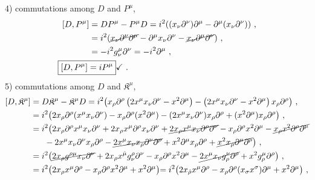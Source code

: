 \documentclass[12pt,a4paper]{report}
\begin{document}
4) commutations among $D$ and $P^{{\mu}}$,
\begin{align*}
    \left[D, P^{{\mu}}\right]&=DP^{\mu}-P^{{\mu}}D=i^2((x_{{\nu}}\partial^{{\nu}})\partial^{{\mu}}-\partial^{{\mu}}(x_{{\nu}}\partial^{{\nu}}))~,\\
    &=i^2(\cancel{x_{{\nu}}\partial^{{\nu}}\partial^{{\mu}}}-\partial^{{\mu}}x_{{\nu}}\partial^{{\nu}}-\cancel{x_{{\nu}}\partial^{{\mu}}\partial^{{\nu}}})~,\\
    &=-i^2g^{{\mu}}_{{\nu}}\partial^{{\nu}}=-i^2\partial^{{\mu}}~,\\
    \Aboxed{\left[D, P^{{\mu}}\right]&=iP^{{\mu}}}\checkmark~.
\end{align*}
5) commutations among $D$ and $\mathfrak{K}^{{\mu}}$,
\begin{align*}
    \left[D, \mathfrak{K}^{{\mu}}\right]&=D\mathfrak{K}^{{\mu}}- \mathfrak{K}^{{\mu}}D=i^2\bigl(x_{{\rho}}\partial^{{\rho}} \left(2x^{{\mu}}x_{{\nu}}\partial^{{\nu}}-x^2\partial^{{\mu}}\right)-\left(2x^{{\mu}}x_{{\nu}}\partial^{{\nu}}-x^2\partial^{{\mu}}\right)x_{{\rho}}\partial^{{\rho}}\bigl)~,\\
    &=i^2\bigl(2x_{{\rho}}\partial^{{\rho}}(x^{{\mu}}x_{{\nu}}\partial^{{\nu}})-x_{{\rho}}\partial^{{\rho}}(x^2\partial^{{\mu}})-(2x^{{\mu}}x_{{\nu}}\partial^{{\nu}})x_{{\rho}}\partial^{{\rho}}+(x^2\partial^{{\mu}})x_{{\rho}}\partial^{{\rho}}\bigl)~,\\
    &=i^2\bigl(2x_{{\rho}}\partial^{{\rho}}x^{{\mu}}x_{{\nu}}\partial^{{\nu}}+2x_{{\rho}}x^{{\mu}}\partial^{{\rho}}x_{{\nu}}\partial^{{\nu}}+\cancel{2x_{{\rho}}x^{{\mu}}x_{{\nu}}\partial^{{\rho}}\partial^{{\nu}}}-x_{{\rho}}\partial^{{\rho}}x^2\partial^{{\mu}}-\cancel{x_{{\rho}}x^2\partial^{{\rho}}\partial^{{\mu}}}\nonumber\\
    &~~~~~-2x^{{\mu}}x_{{\nu}}\partial^{{\nu}}x_{{\rho}}\partial^{{\rho}}-\cancel{2x^{{\mu}}x_{{\nu}}x_{{\rho}}\partial^{{\nu}}\partial^{{\rho}}}+x^2\partial^{{\mu}}x_{{\rho}}\partial^{{\rho}}+\cancel{x^2x_{{\rho}}\partial^{{\mu}}\partial^{{\rho}}}\bigl)~,\\
    &=i^2\bigl(\cancel{2x_{{\rho}}g^{{\rho}{\mu}}x_{{\nu}}\partial^{{\nu}}}+2x_{{\rho}}x^{\hat{\mu}}g^{{\rho}}_{{\nu}}\partial^{{\nu}}-x_{{\rho}}\partial^{{\rho}}x^2\partial^{{\mu}}-\cancel{2x^{{\mu}}x_{{\nu}}g^{{\nu}}_{{\rho}}\partial^{{\rho}}}+x^2g^{{\mu}}_{{\rho}}\partial^{{\rho}}\bigl)~,\\
    &=i^2\bigl(2x_{{\rho}}x^{{\mu}}\partial^{{\rho}}-x_{{\rho}}\partial^{{\rho}}x^2\partial^{{\mu}}+x^2\partial^{{\mu}}\bigl)=i^2\bigl(2x_{\hat{\rho}}x^{{\mu}}\partial^{{\rho}}-x_{{\rho}}\partial^{{\rho}}(x_{{\sigma}}x^{{\sigma}})\partial^{{\mu}}+x^2\partial^{{\mu}}\bigl)~,\\

\end{align*}
\end{document}
